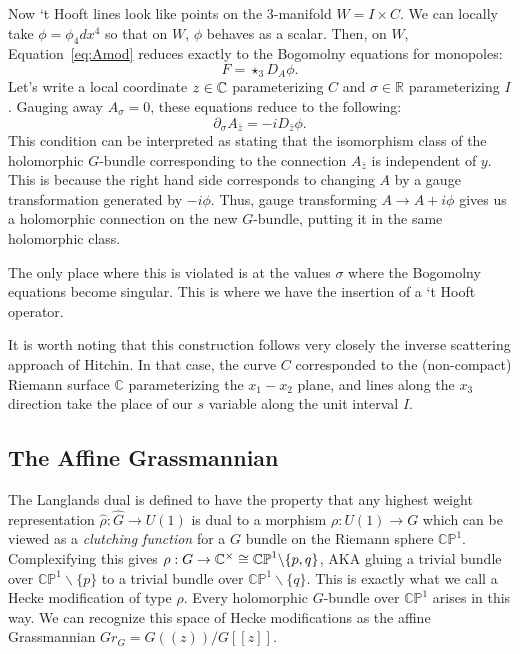 	Now `t Hooft lines look like points on the 3-manifold $W = I \times C$. We can locally take $\phi = \phi_4 dx^4$ so that on $W$, $\phi$ behaves as a scalar. Then, on $W$, Equation~\eqref{eq:Amod} reduces exactly to the Bogomolny equations for monopoles:
	\[
		F = \star_3 D_A \phi.
	\]
	Let's write a local coordinate $z \in \mathbb{C}$ parameterizing $C$ and $\sigma \in \mathbb R$ parameterizing $I$.
	Gauging away $A_\sigma = 0$, these equations reduce to the following:
	\[
		\partial_\sigma A_{\bar z} = - i D_{\bar z} \phi.
	\]
	This condition can be interpreted as stating that the isomorphism class of the holomorphic $G$-bundle corresponding to the connection $A_{\bar z}$ is independent of $y$. This is because the right hand side corresponds to changing $A$ by a gauge transformation generated by $-i \phi$. Thus, gauge transforming $A \to A + i \phi$ gives us a holomorphic connection on the new $G$-bundle, putting it in the same holomorphic class.
	
	 The only place where this is violated is at the values $\sigma$ where the Bogomolny equations become singular. This is where we have the insertion of a `t Hooft operator. 
	 
	 It is worth noting that this construction follows very closely the inverse scattering approach of Hitchin\cite{hitchin1982}\cite{atiyahhitchin1988}. In that case, the curve $C$ corresponded to the (non-compact) Riemann surface $\mathbb C$ parameterizing the $x_1-x_2$ plane, and lines along the $x_3$ direction take the place of our $s$ variable along the unit interval $I$.
	
	\subsection{The Affine Grassmannian}
	
	The Langlands dual is defined to have the property that any highest weight representation $\hat \rho: \hat G \to U(1)$ is dual to a morphism $\rho: U(1) \to G$ which can be viewed as a \emph{clutching function} for a $G$ bundle on the Riemann sphere $\mathbb{CP}^1$. Complexifying this gives $\rho: G \to \mathbb{C}^\times \cong \mathbb{CP}^1 \backslash \{p, q \}$, AKA gluing a trivial bundle over $\mathbb{CP}^1 \backslash \{p \}$ to a trivial bundle over $\mathbb{CP}^1 \backslash \{q \}$. This is exactly what we call a Hecke modification of type $\rho$. Every holomorphic $G$-bundle over $\mathbb{CP}^1$ arises in this way. We can recognize this space of Hecke modifications as the affine Grassmannian $Gr_G = G((z))/G[[z]]$.
	

